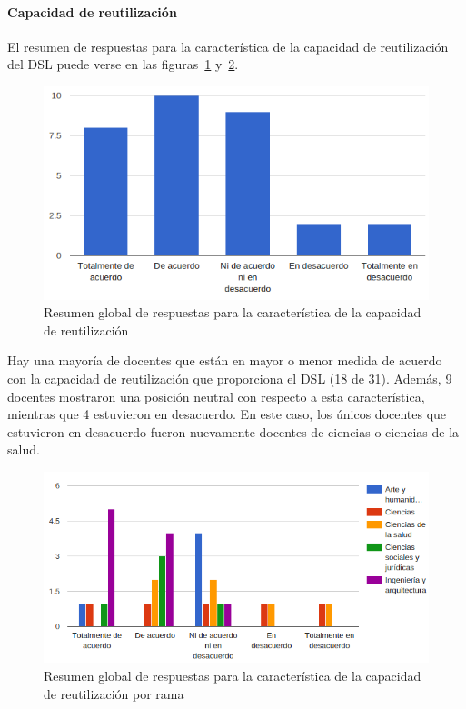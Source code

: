 \newpage
\paragraph*{Capacidad de reutilización}

El resumen de respuestas para la característica de la capacidad de reutilización del DSL puede verse en las figuras~\ref{fig:evalmetodo:dsl:reutilizable} y~\ref{fig:evalmetodo:dsl:reutilizable:rama}.

\begin{figure}[h]
  \begin{center}
    \includegraphics[scale=0.45]{C_DSL_reutilizable.png}
  \end{center}
  \caption{Resumen global de respuestas para la característica de la capacidad de reutilización}
  \label{fig:evalmetodo:dsl:reutilizable}
\end{figure}

Hay una mayoría de docentes que están en mayor o menor medida de acuerdo con la capacidad de reutilización que proporciona el DSL (18 de 31). Además, 9 docentes mostraron una posición neutral con respecto a esta característica, mientras que 4 estuvieron en desacuerdo. En este caso, los únicos docentes que estuvieron en desacuerdo fueron nuevamente docentes de ciencias o ciencias de la salud.

\begin{figure}[h]
  \begin{center}
    \includegraphics[scale=0.45]{C_DSL_reutilizable_rama.png}
  \end{center}
  \caption{Resumen global de respuestas para la característica de la capacidad de reutilización por rama}
  \label{fig:evalmetodo:dsl:reutilizable:rama}
\end{figure}

